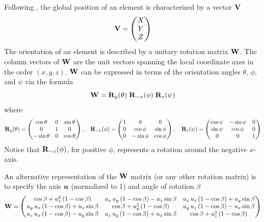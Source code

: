 Following \mad, the global position of an element is characterized by
a vector ${\bf V}$ 
\begin{equation}
  {\bf V} = 
  \begin{pmatrix}
    X \\ Y \\ Z 
  \end{pmatrix}
\end{equation}
The orientation of an element is described by a unitary rotation matrix ${\bf W}$. The column vectors
of ${\bf W}$ are the unit vectors spanning the local coordinate axes in the order $(x, y, z)$. ${\bf W}$
can be expressed in terms of the orientation angles $\theta$, $\phi$, and $\psi$ via the formula
\begin{equation}
  {\bf W} = {\bf R}_{y}(\theta) \; {\bf R}_{-x}(\phi) \; {\bf R}_{z}(\psi)
  \label{wwww}
\end{equation}
where
\begin{equation}
  {\bf R}_{y}(\theta) = 
  \begin{pmatrix}
    \cos\theta  & 0 & \sin\theta \\
    0           & 1 & 0          \\
    -\sin\theta & 0 & \cos\theta 
  \end{pmatrix}, \quad
  {\bf R}_{-x}(\phi) = 
  \begin{pmatrix}
    1 & 0 & 0                \\
    0 & \cos\phi  & \sin\phi \\
    0 & -\sin\phi & \cos\phi 
  \end{pmatrix}, \quad
  {\bf R}_{z}(\psi) = 
  \begin{pmatrix}
    \cos\psi & -\sin\psi & 0 \\
    \sin\psi &  \cos\psi & 0 \\
    0        &  0        & 1                
  \end{pmatrix}
  \label{wtt0t}
\end{equation}
Notice that ${\bf R}_{-x}(\phi)$, for positive $\phi$, represents a rotation around the negative
$x$-axis.

An alternative representation of the ${\bf W}$ matrix (or any other rotation matrix) is to specify the
axis ${\bf u}$ (normalized to 1) and angle of rotation $\beta$
\begin{equation}
  {\bf W} = \begin{pmatrix}
    \cos \beta + u_x^2 \left(1 - \cos \beta \right) & 
    u_x \, u_y \left(1 - \cos \beta \right) - u_z \sin \beta & 
    u_x \, u_z \left(1 - \cos \beta \right) + u_y \sin \beta \\ 
    u_y \, u_x \left(1 - \cos \beta \right) + u_z \sin \beta & 
    \cos \beta + u_y^2\left(1 - \cos \beta \right) & 
    u_y \, u_z \left(1 - \cos \beta \right) - u_x \sin \beta \\ 
    u_z \, u_x \left(1 - \cos \beta \right) - u_y \sin \beta & 
    u_z \, u_y \left(1 - \cos \beta \right) + u_x \sin \beta & 
    \cos \beta + u_z^2\left(1 - \cos \beta \right)
  \end{pmatrix}
  \label{wctux2}
\end{equation}

